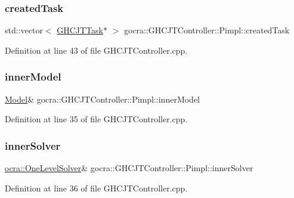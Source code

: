 \subsubsection{\texorpdfstring{created\+Task}{createdTask}}
{\footnotesize\ttfamily std\+::vector$<$ \hyperlink{classgocra_1_1GHCJTTask}{G\+H\+C\+J\+T\+Task}$\ast$ $>$ gocra\+::\+G\+H\+C\+J\+T\+Controller\+::\+Pimpl\+::created\+Task}



Definition at line 43 of file G\+H\+C\+J\+T\+Controller.\+cpp.

\hypertarget{structgocra_1_1GHCJTController_1_1Pimpl_a43eb79ddf7ef332d76d850711fc57e8e}{}\label{structgocra_1_1GHCJTController_1_1Pimpl_a43eb79ddf7ef332d76d850711fc57e8e} 
\subsubsection{\texorpdfstring{inner\+Model}{innerModel}}
{\footnotesize\ttfamily \hyperlink{classocra_1_1Model}{Model}\& gocra\+::\+G\+H\+C\+J\+T\+Controller\+::\+Pimpl\+::inner\+Model}



Definition at line 35 of file G\+H\+C\+J\+T\+Controller.\+cpp.

\hypertarget{structgocra_1_1GHCJTController_1_1Pimpl_af06224d9d2a704cb042b5b01d3bf18ab}{}\label{structgocra_1_1GHCJTController_1_1Pimpl_af06224d9d2a704cb042b5b01d3bf18ab} 
\subsubsection{\texorpdfstring{inner\+Solver}{innerSolver}}
{\footnotesize\ttfamily \hyperlink{classocra_1_1OneLevelSolver}{ocra\+::\+One\+Level\+Solver}\& gocra\+::\+G\+H\+C\+J\+T\+Controller\+::\+Pimpl\+::inner\+Solver}



Definition at line 36 of file G\+H\+C\+J\+T\+Controller.\+cpp.

\hypertarget{structgocra_1_1GHCJTController_1_1Pimpl_a04bbff0e011a7c0b2bff47c08ed32993}{}\label{structgocra_1_1GHCJTController_1_1Pimpl_a04bbff0e011a7c0b2bff47c08ed32993} 

